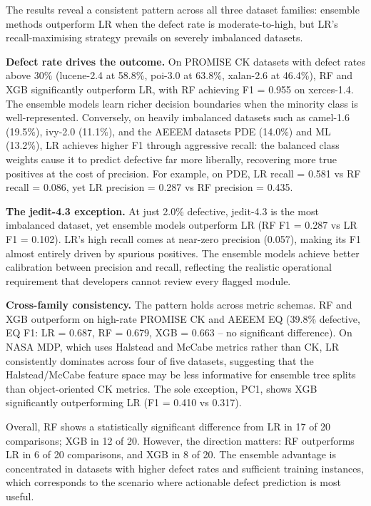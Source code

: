 \documentclass[10pt, a4paper]{article}
\makeatletter
\renewcommand\subsection{\@startsection{subsection}{2}{\z@}{0.6em}{0.05em}{\normalfont\large\bfseries}}
\makeatother
\begin{document}
\subsection{Discussion}

The results reveal a consistent pattern across all three dataset families: ensemble methods outperform LR when the defect rate is moderate-to-high, but LR's recall-maximising strategy prevails on severely imbalanced datasets.

\textbf{Defect rate drives the outcome.} On PROMISE CK datasets with defect rates above 30\% (lucene-2.4 at 58.8\%, poi-3.0 at 63.8\%, xalan-2.6 at 46.4\%), RF and XGB significantly outperform LR, with RF achieving F1 = 0.955 on xerces-1.4. The ensemble models learn richer decision boundaries when the minority class is well-represented. Conversely, on heavily imbalanced datasets such as camel-1.6 (19.5\%), ivy-2.0 (11.1\%), and the AEEEM datasets PDE (14.0\%) and ML (13.2\%), LR achieves higher F1 through aggressive recall: the balanced class weights cause it to predict defective far more liberally, recovering more true positives at the cost of precision. For example, on PDE, LR recall = 0.581 vs RF recall = 0.086, yet LR precision = 0.287 vs RF precision = 0.435.

\textbf{The jedit-4.3 exception.} At just 2.0\% defective, jedit-4.3 is the most imbalanced dataset, yet ensemble models outperform LR (RF F1 = 0.287 vs LR F1 = 0.102). LR's high recall comes at near-zero precision (0.057), making its F1 almost entirely driven by spurious positives. The ensemble models achieve better calibration between precision and recall, reflecting the realistic operational requirement that developers cannot review every flagged module.

\textbf{Cross-family consistency.} The pattern holds across metric schemas. RF and XGB outperform on high-rate PROMISE CK and AEEEM EQ (39.8\% defective, EQ F1: LR = 0.687, RF = 0.679, XGB = 0.663 -- no significant difference). On NASA MDP, which uses Halstead and McCabe metrics rather than CK, LR consistently dominates across four of five datasets, suggesting that the Halstead/McCabe feature space may be less informative for ensemble tree splits than object-oriented CK metrics. The sole exception, PC1, shows XGB significantly outperforming LR (F1 = 0.410 vs 0.317).

Overall, RF shows a statistically significant difference from LR in 17 of 20 comparisons; XGB in 12 of 20. However, the direction matters: RF outperforms LR in 6 of 20 comparisons, and XGB in 8 of 20. The ensemble advantage is concentrated in datasets with higher defect rates and sufficient training instances, which corresponds to the scenario where actionable defect prediction is most useful.
\end{document}
